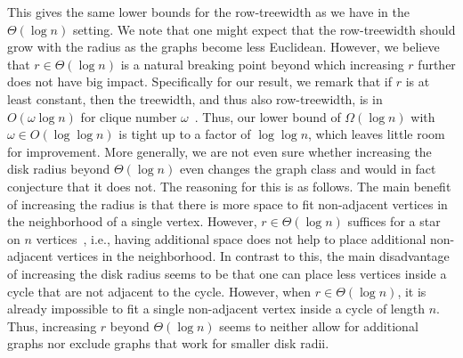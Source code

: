 %
This gives the same lower bounds for the row-treewidth as we have in the $ \Theta(\log n)$ setting.
We note that one might expect that the row-treewidth should grow with the radius as the graphs become less Euclidean.
However, we believe that $r \in \Theta(\log n)$ is a natural breaking point beyond which increasing $r$ further does not have big impact.
Specifically for our result, we remark that if $r $ is at least constant, then the treewidth, and thus also row-treewidth, is in $O(\omega \log n)$ for clique number $ \omega $~\cite{Struc_Indep_Hyper_Unifor_Disk_Graph-Blaesius25,Treew_Graph_Balan_Separ-DvoraNorin19}.
Thus, our lower bound of $\Omega(\log n)$ with $\omega \in O(\log\log n)$ is tight up to a factor of $\log\log n$, which leaves little room for improvement.
%
More generally, we are not even sure whether increasing the disk radius beyond $\Theta(\log n)$ even changes the graph class and would in fact conjecture that it does not.
The reasoning for this is as follows.
The main benefit of increasing the radius is that there is more space to fit non-adjacent vertices in the neighborhood of a single vertex.
However, $r \in \Theta(\log n)$ suffices for a star on $n$ vertices~\cite{Struc_Indep_Hyper_Unifor_Disk_Graph-Blaesius25}, i.e., having additional space does not help to place additional non-adjacent vertices in the neighborhood.
In contrast to this, the main disadvantage of increasing the disk radius seems to be that one can place less vertices inside a cycle that are not adjacent to the cycle.
However, when $r \in \Theta(\log n)$, it is already impossible to fit a single non-adjacent vertex inside a cycle of length $n$.
Thus, increasing $r$ beyond $\Theta(\log n)$ seems to neither allow for additional graphs nor exclude graphs that work for smaller disk radii.
%
%
%
%
% 
%
%
%
%
